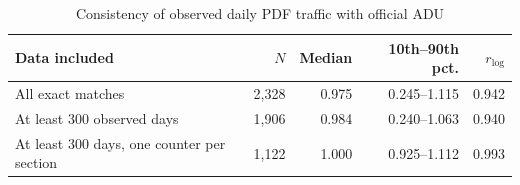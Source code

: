 \begin{table}[H]
\centering
\small
\caption{Consistency of observed daily PDF traffic with official ADU}

\begin{tabularx}{\textwidth}{Xrrrr}
\toprule
Data included & \(N\) & Median & 10th--90th pct. & \(r_{\log}\) \\
\midrule
All exact matches & 2,328 & 0.975 & 0.245--1.115 & 0.942 \\ \grayhline
At least 300 observed days & 1,906 & 0.984 & 0.240--1.063 & 0.940 \\ \grayhline
At least 300 days, one counter per section & 1,122 & 1.000 & 0.925--1.112 & 0.993 \\
\bottomrule
\end{tabularx}
\end{table}

